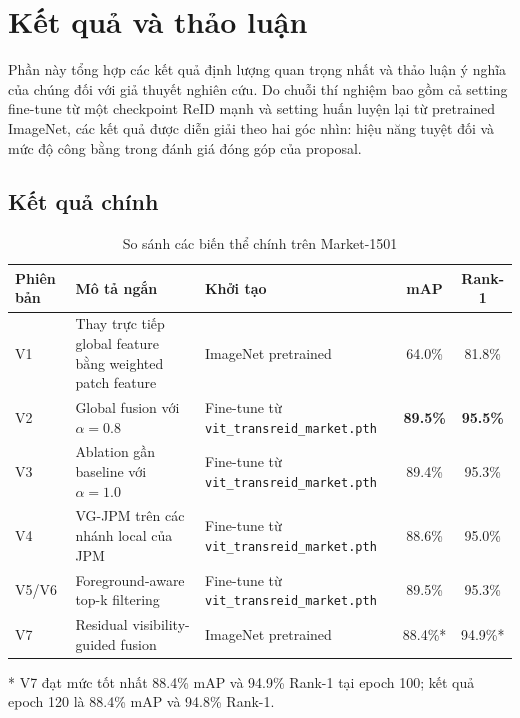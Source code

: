 \section{Kết quả và thảo luận}

Phần này tổng hợp các kết quả định lượng quan trọng nhất và thảo luận ý nghĩa của chúng đối với giả thuyết nghiên cứu. Do chuỗi thí nghiệm bao gồm cả setting fine-tune từ một checkpoint ReID mạnh và setting huấn luyện lại từ pretrained ImageNet, các kết quả được diễn giải theo hai góc nhìn: hiệu năng tuyệt đối và mức độ công bằng trong đánh giá đóng góp của proposal.

\subsection{Kết quả chính}

\begin{table}[!t]
    \centering
    \caption{So sánh các biến thể chính trên Market-1501}
    \label{tab:main_results}
    \begin{tabular}{p{1.1cm} p{4.8cm} p{3.6cm} c c}
        \hline
        Phiên bản & Mô tả ngắn & Khởi tạo & mAP & Rank-1 \\
        \hline
        V1 & Thay trực tiếp global feature bằng weighted patch feature & ImageNet pretrained & 64.0\% & 81.8\% \\
        V2 & Global fusion với \(\alpha = 0.8\) & Fine-tune từ \texttt{vit\_transreid\_market.pth} & \textbf{89.5\%} & \textbf{95.5\%} \\
        V3 & Ablation gần baseline với \(\alpha = 1.0\) & Fine-tune từ \texttt{vit\_transreid\_market.pth} & 89.4\% & 95.3\% \\
        V4 & VG-JPM trên các nhánh local của JPM & Fine-tune từ \texttt{vit\_transreid\_market.pth} & 88.6\% & 95.0\% \\
        V5/V6 & Foreground-aware top-k filtering & Fine-tune từ \texttt{vit\_transreid\_market.pth} & 89.5\% & 95.3\% \\
        V7 & Residual visibility-guided fusion & ImageNet pretrained & 88.4\%* & 94.9\%* \\
        \hline
    \end{tabular}

    \vspace{4pt}

    \footnotesize{* V7 đạt mức tốt nhất 88.4\% mAP và 94.9\% Rank-1 tại epoch 100; kết quả epoch 120 là 88.4\% mAP và 94.8\% Rank-1.}
\end{table}

